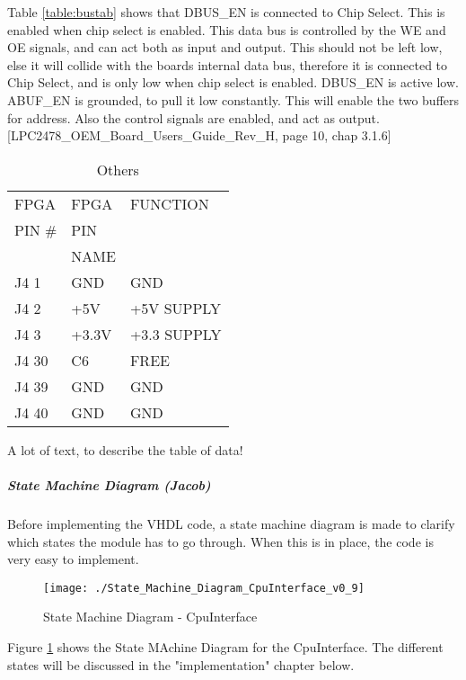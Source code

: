 Table \ref{table:bustab} shows that DBUS\_EN is connected to Chip Select. This is enabled when chip select is enabled. This data bus is controlled by the WE and OE signals, and can act both as input and output. This should not be left low, else it will collide with the boards internal data bus, therefore it is connected to Chip Select, and is only low when chip select is enabled. DBUS\_EN is active low. \\
ABUF\_EN is grounded, to pull it low constantly. This will enable the two buffers for address. Also the control signals are enabled, and act as output. [LPC2478\_OEM\_Board\_Users\_Guide\_Rev\_H, page 10, chap 3.1.6] 


\begin{table}[H]
\begin{center}
\caption{Others}
\begin{tabular}{|l|l||l|}
\hline FPGA & FPGA & FUNCTION \\ 
PIN \# & PIN & \\
 & NAME & \\
\hline J4 1 & GND & GND \\ 
\hline J4 2 & +5V & +5V SUPPLY \\ 
\hline J4 3 & +3.3V & +3.3 SUPPLY \\ 
\hline J4 30 & C6 & FREE \\ 
\hline J4 39 & GND & GND \\ 
\hline J4 40 & GND & GND \\ 
\hline 
\end{tabular} 
\label{table:otherstab} %
\end{center}
\end{table}
A lot of text, to describe the table of data!




\subparagraph{State Machine Diagram (Jacob)}
Before implementing the VHDL code, a state machine diagram is made to clarify which states the module has to go through. When this is in place, the code is very easy to implement.
\begin{figure}[H]
\centering
\texttt{[image: ./State\_Machine\_Diagram\_CpuInterface\_v0\_9]}
\caption{State Machine Diagram - CpuInterface}
\label{fig:State_Machine_Diagram_CpuInterface_v0_9}
\end{figure}
Figure \ref{fig:State_Machine_Diagram_CpuInterface_v0_9} shows the State MAchine Diagram for the CpuInterface. The different states will be discussed in the "implementation" chapter below.

